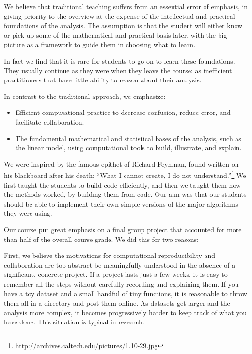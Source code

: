 We believe that traditional teaching suffers from an essential error of
emphasis, in giving priority to the overview at the expense of the
intellectual and practical foundations of the analysis.  The assumption is
that the student will either know or pick up some of the mathematical and
practical basis later, with the big picture as a framework to guide them in
choosing what to learn.

In fact we find that it is rare for students to go on to learn these
foundations. They usually continue as they were when they leave the course:
as inefficient practitioners that have little ability to reason about their
analysis.


In contrast to the traditional approach, we emphasize:

\begin{itemize}

\item
    Efficient computational practice to decrease confusion, reduce error, and
    facilitate collaboration.

\item
    The fundamental mathematical and statistical bases of the analysis, such
    as the linear model, using computational tools to build, illustrate, and
    explain.

\end{itemize}

We were inspired by the famous epithet of Richard Feynman, found written on
his blackboard after his death: ``What I cannot create, I do not
understand.''\footnote{\url{http://archives.caltech.edu/pictures/1.10-29.jpg}}
We first taught the students to build code efficiently, and then we taught
them how the methods worked, by building them from code.  Our aim was that our
students should be able to implement their own simple versions of the major
algorithms they were using.

Our course put great emphasis on a final group project that accounted for more
than half of the overall course grade.  We did this for two reasons:

First, we believe the motivations for computational reproducibility and
collaboration are too abstract be meaningfully understood in the absence of a
significant, concrete project.  If a project lasts just a few weeks, it is
easy to remember all the steps without carefully recording and explaining
them.  If you have a toy dataset and a small handful of tiny functions, it is
reasonable to throw them all in a directory and post them online.  As datasets
get larger and the analysis more complex, it becomes progressively harder to
keep track of what you have done.  This situation is typical in research.


